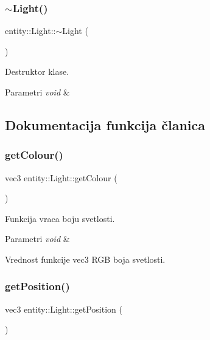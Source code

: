 \subsubsection{\texorpdfstring{$\sim$\+Light()}{~Light()}}
{\footnotesize\ttfamily entity\+::\+Light\+::$\sim$\+Light (\begin{DoxyParamCaption}{ }\end{DoxyParamCaption})}



Destruktor klase. 


\begin{DoxyParams}{Parametri}
{\em void} & \\
\hline
\end{DoxyParams}


\subsection{Dokumentacija funkcija članica}
\mbox{\label{classentity_1_1Light_a84799bc558b5c06758cd5e343243df4b}} 
\subsubsection{\texorpdfstring{get\+Colour()}{getColour()}}
{\footnotesize\ttfamily vec3 entity\+::\+Light\+::get\+Colour (\begin{DoxyParamCaption}{ }\end{DoxyParamCaption})}



Funkcija vraca boju svetlosti. 


\begin{DoxyParams}{Parametri}
{\em void} & \\
\hline
\end{DoxyParams}
\begin{DoxyReturn}{Vrednost funkcije}
vec3 R\+GB boja svetlosti. 
\end{DoxyReturn}
\mbox{\label{classentity_1_1Light_aca0644bed009e20c672224ed0c92546e}} 
\subsubsection{\texorpdfstring{get\+Position()}{getPosition()}}
{\footnotesize\ttfamily vec3 entity\+::\+Light\+::get\+Position (\begin{DoxyParamCaption}{ }\end{DoxyParamCaption})}



